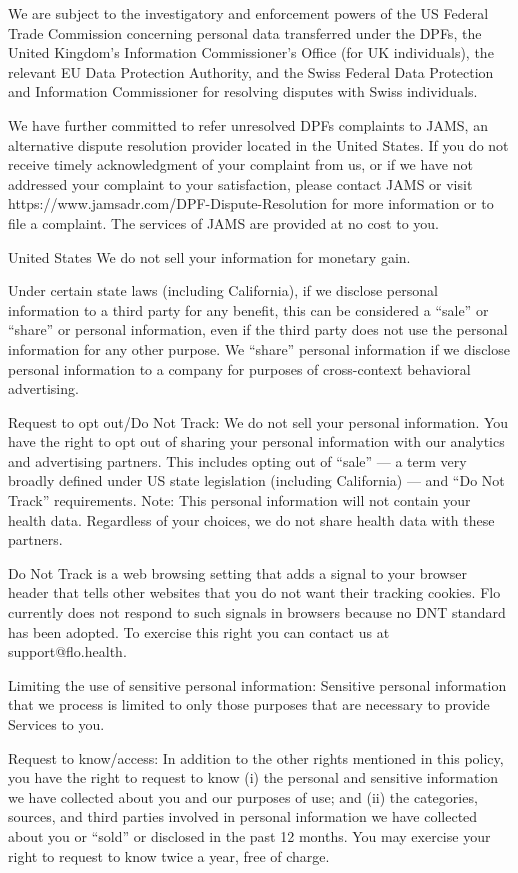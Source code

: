 We are subject to the investigatory and enforcement powers of the US Federal Trade Commission concerning personal data transferred under the DPFs, the United Kingdom’s Information Commissioner’s Office (for UK individuals), the relevant EU Data Protection Authority, and the Swiss Federal Data Protection and Information Commissioner for resolving disputes with Swiss individuals. 

We have further committed to refer unresolved DPFs complaints to JAMS, an alternative dispute resolution provider located in the United States. If you do not receive timely acknowledgment of your complaint from us, or if we have not addressed your complaint to your satisfaction, please contact JAMS or visit https://www.jamsadr.com/DPF-Dispute-Resolution for more information or to file a complaint. The services of JAMS are provided at no cost to you.

United States
We do not sell your information for monetary gain.

Under certain state laws (including California), if we disclose personal information to a third party for any benefit, this can be considered a “sale” or “share” or personal information, even if the third party does not use the personal information for any other purpose. We “share” personal information if we disclose personal information to a company for purposes of cross-context behavioral advertising. 

Request to opt out/Do Not Track: We do not sell your personal information. You have the right to opt out of sharing your personal information with our analytics and advertising partners. This includes opting out of “sale” — a term very broadly defined under US state legislation (including California) — and “Do Not Track” requirements. Note: This personal information will not contain your health data. Regardless of your choices, we do not share health data with these partners.

Do Not Track is a web browsing setting that adds a signal to your browser header that tells other websites that you do not want their tracking cookies. Flo currently does not respond to such signals in browsers because no DNT standard has been adopted. To exercise this right you can contact us at support@flo.health. 

Limiting the use of sensitive personal information: Sensitive personal information that we process is limited to only those purposes that are necessary to provide Services to you.

Request to know/access: In addition to the other rights mentioned in this policy, you have the right to request to know (i) the personal and sensitive information we have collected about you and our purposes of use; and (ii) the categories, sources, and third parties involved in personal information we have collected about you or “sold” or disclosed in the past 12 months. You may exercise your right to request to know twice a year, free of charge.

